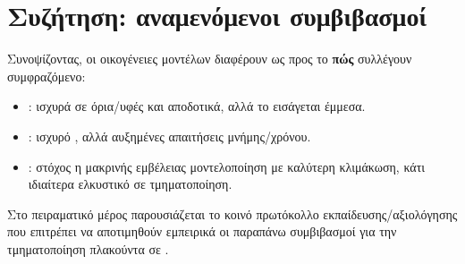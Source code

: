 \section{ Συζήτηση: αναμενόμενοι συμβιβασμοί}
\label{sec:tradeoffs}

Συνοψίζοντας, οι οικογένειες μοντέλων διαφέρουν ως προς το \textbf{πώς} συλλέγουν συμφραζό\-μενο:
\begin{itemize}
  \item \textbf{}: ισχυρά σε όρια/υφές και αποδοτικά, αλλά το  εισάγεται έμμεσα.
  \item \textbf{}: ισχυρό , αλλά αυξημένες απαιτήσεις μνήμης/χρόνου.
  \item \textbf{}: στόχος η μακρινής εμβέλειας μοντελοποίηση με καλύτερη κλιμά\-κωση, κάτι ιδιαίτερα ελκυστικό σε  τμηματοποίηση.
\end{itemize}

Στο πειραματικό μέρος παρουσιάζεται το κοινό πρωτόκολλο εκπαίδευσης/αξιολόγησης που επιτρέπει να αποτιμηθούν εμπειρικά 
οι παραπάνω συμβιβασμοί για την τμηματοποίηση πλακούντα σε . 
